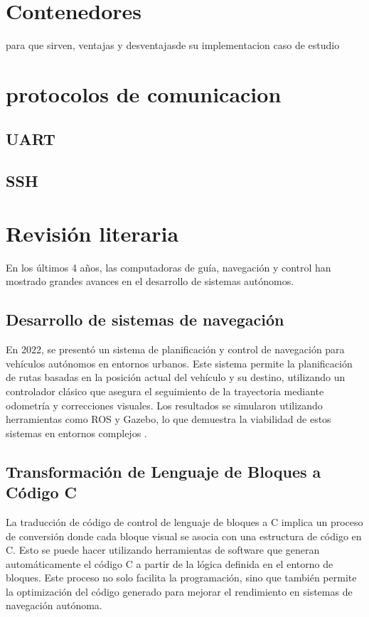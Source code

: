\section{Contenedores}

para que sirven, ventajas y desventajasde su implementacion caso de estudio

\section{protocolos de comunicacion}

\subsection{UART}

\subsection{SSH}

\section{Revisión literaria}
En los últimos 4 años, las computadoras de guía, navegación y control han mostrado grandes avances en el desarrollo de sistemas autónomos.

\subsection{Desarrollo de sistemas de navegación}

En 2022, se presentó un sistema de planificación y control de navegación para vehículos autónomos en entornos urbanos. Este sistema permite la planificación 
de rutas basadas en la posición actual del vehículo y su destino, utilizando un controlador clásico que asegura el seguimiento de la trayectoria mediante 
odometría y correcciones visuales. Los resultados se simularon utilizando herramientas como ROS y Gazebo, lo que demuestra la viabilidad de estos sistemas en 
entornos complejos \cite{BarreraRamrez2022SistemaDP}. 

\subsection{Transformación de Lenguaje de Bloques a Código C}

La traducción de código de control de lenguaje de bloques a C implica un proceso de conversión donde cada bloque visual se asocia con una estructura de código 
en C. Esto se puede hacer utilizando herramientas de software que generan automáticamente el código C a partir de la lógica definida en el entorno de bloques. 
Este proceso no solo facilita la programación, sino que también permite la optimización del código generado para mejorar el rendimiento en sistemas de navegación 
autónoma.

